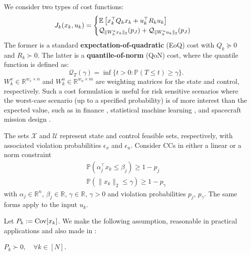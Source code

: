 We consider two types of cost functions:
\begin{equation} \label{eq:objective_function}
	J_k (x_k, u_k) = \begin{cases}
	\mathbb{E}\left[x_k^\top Q_k x_k + u_k^\top R_k u_k\right] \\
	\mathcal{Q}_{\|W_{k}^x x_k\|_2}(p_J) +
	\mathcal{Q}_{\|W_{k}^u u_k\|_2}(p_J)
	\end{cases}
\end{equation}
The former is a standard \textbf{expectation-of-quadratic} (EoQ) cost with \( Q_k \succeq 0 \) and \( R_k \succ 0 \).
The latter is a \textbf{quantile-of-norm} (QoN) cost, where the quantile function is defined as:
\begin{equation}
	\mathcal{Q}_{T}(\gamma) = \inf \{ t > 0 : \mathbb{P}(T \leq t) \geq \gamma \}.
\end{equation}
$W_k^x \in \mathbb{R}^{w_x \times n}$ and $W_k^u \in \mathbb{R}^{w_u \times m}$ are weighting matrices for the state and control, respectively. Such a cost formulation is useful for risk sensitive scenarios where the worst-case scenario (up to a specified probability) is of more interest than the expected value, such as in finance \cite{rockafellarOptimizationConditionalValueatrisk2000}, statistical machine learning \cite{eastwoodProbableDomainGeneralization2022}, and spacecraft mission design \cite{oguriChanceConstrainedControlSafe2024a}.

The sets \( \mathcal{X} \) and \( \mathcal{U} \) represent state and control feasible sets, respectively, with associated violation probabilities \( \epsilon_x \) and \( \epsilon_u \). Consider CCs in either a linear or a norm constraint
\begin{align} 
	\mathbb{P}(\alpha_j ^\top x_k \leq \beta_j) \geq 1 - p_j \label{eq:linear_chance_constraint}\\
	\mathbb{P}(\| x_k \|_2 \leq \gamma) \geq 1 - p_\gamma \label{eq:norm_chance_constraint}
\end{align}
with \( \alpha_j \in \mathbb{R}^n \), \( \beta_j \in \mathbb{R} \), \(\gamma\in \mathbb{R}\), \( \gamma > 0 \) and violation probabilities  \( p_j \), \( p_\gamma \). The same forms apply to the input \( u_k \).

Let $P_k := \mathrm{Cov}[x_k ]$.
We make the following assumption, reasonable in practical applications and also made in \cite{liuOptimalCovarianceSteering2025}:
\begin{assumption} \label{assump:positive_definite_state}
	$P_k \succ 0,\quad \forall k \in [N].$
\end{assumption}



